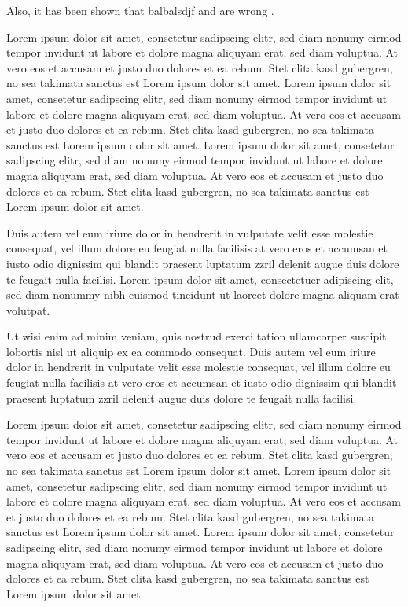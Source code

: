 \documentclass[11pt]{article}
\begin{document}
Also, it has been shown that balbalsdjf and  are wrong \cite{chua1993cnn}.

\newpage
Lorem ipsum dolor sit amet, consetetur sadipscing elitr, sed diam nonumy eirmod tempor invidunt ut labore et dolore magna aliquyam erat, sed diam voluptua. At vero eos et accusam et justo duo dolores et ea rebum. Stet clita kasd gubergren, no sea takimata sanctus est Lorem ipsum dolor sit amet. Lorem ipsum dolor sit amet, consetetur sadipscing elitr, sed diam nonumy eirmod tempor invidunt ut labore et dolore magna aliquyam erat, sed diam voluptua. At vero eos et accusam et justo duo dolores et ea rebum. Stet clita kasd gubergren, no sea takimata sanctus est Lorem ipsum dolor sit amet. Lorem ipsum dolor sit amet, consetetur sadipscing elitr, sed diam nonumy eirmod tempor invidunt ut labore et dolore magna aliquyam erat, sed diam voluptua. At vero eos et accusam et justo duo dolores et ea rebum. Stet clita kasd gubergren, no sea takimata sanctus est Lorem ipsum dolor sit amet.   

Duis autem vel eum iriure dolor in hendrerit in vulputate velit esse molestie consequat, vel illum dolore eu feugiat nulla facilisis at vero eros et accumsan et iusto odio dignissim qui blandit praesent luptatum zzril delenit augue duis dolore te feugait nulla facilisi. Lorem ipsum dolor sit amet, consectetuer adipiscing elit, sed diam nonummy nibh euismod tincidunt ut laoreet dolore magna aliquam erat volutpat.   

Ut wisi enim ad minim veniam, quis nostrud exerci tation ullamcorper suscipit lobortis nisl ut aliquip ex ea commodo consequat. Duis autem vel eum iriure dolor in hendrerit in vulputate velit esse molestie consequat, vel illum dolore eu feugiat nulla facilisis at vero eros et accumsan et iusto odio dignissim qui blandit praesent luptatum zzril delenit augue duis dolore te feugait nulla facilisi. 

Lorem ipsum dolor sit amet, consetetur sadipscing elitr, sed diam nonumy eirmod tempor invidunt ut labore et dolore magna aliquyam erat, sed diam voluptua. At vero eos et accusam et justo duo dolores et ea rebum. Stet clita kasd gubergren, no sea takimata sanctus est Lorem ipsum dolor sit amet. Lorem ipsum dolor sit amet, consetetur sadipscing elitr, sed diam nonumy eirmod tempor invidunt ut labore et dolore magna aliquyam erat, sed diam voluptua. At vero eos et accusam et justo duo dolores et ea rebum. Stet clita kasd gubergren, no sea takimata sanctus est Lorem ipsum dolor sit amet. Lorem ipsum dolor sit amet, consetetur sadipscing elitr, sed diam nonumy eirmod tempor invidunt ut labore et dolore magna aliquyam erat, sed diam voluptua. At vero eos et accusam et justo duo dolores et ea rebum. Stet clita kasd gubergren, no sea takimata sanctus est Lorem ipsum dolor sit amet.   
\end{document}
